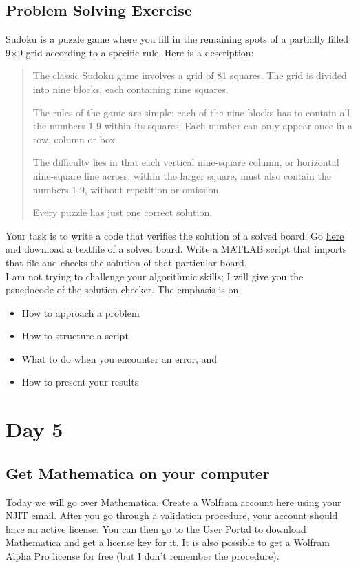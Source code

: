 \documentclass{article}
\begin{document}
\subsection{Problem Solving Exercise}
Sudoku is a puzzle game where you fill in the remaining spots of a partially filled 9$\times$9 grid according to a specific rule. Here is a description:
\begin{quote}
The classic Sudoku game involves a grid of 81 squares. The grid is divided into nine blocks, each containing nine squares.

The rules of the game are simple: each of the nine blocks has to contain all the numbers 1-9 within its squares. Each number can only appear once in a row, column or box.

The difficulty lies in that each vertical nine-square column, or horizontal nine-square line across, within the larger square, must also contain the numbers 1-9, without repetition or omission.

Every puzzle has just one correct solution.\cite{sudoku}
\end{quote}
Your task is to write a code that verifies the solution of a solved board. Go \href{http://lipas.uwasa.fi/~timan/sudoku/}{here} and download a textfile of a solved board. Write a MATLAB script that imports that file and checks the solution of that particular board. \\

I am not trying to challenge your algorithmic skills; I will give you the psuedocode of the solution checker. The emphasis is on
\begin{itemize}
    \item How to approach a problem
    \item How to structure a script
    \item What to do when you encounter an error, and
    \item How to present your results
\end{itemize}




\section{Day 5}
\subsection{Get Mathematica on your computer}
Today we will go over Mathematica. Create a Wolfram account \href{https://account.wolfram.com/auth/create}{here} using your NJIT email. After you go through a validation procedure, your account should have an active license. You can then go to the \href{https://user.wolfram.com/portal/myProducts.html}{User Portal} to download Mathematica and get a license key for it. It is also possible to get a Wolfram Alpha Pro license for free (but I don't remember the procedure).
\end{document}
